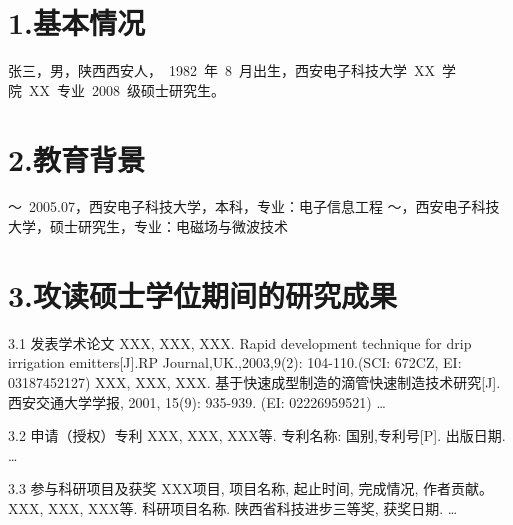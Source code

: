 
\begin{resume}

\section*{1.\hspace{0.75em}基本情况}
张三，男，陕西西安人，~1982~年~8~月出生，西安电子科技大学~XX~学院~XX~专业~2008~级硕士研究生。
\section*{2.\hspace{0.75em}教育背景}
\begin{resumelist*}
～~2005.07，西安电子科技大学，本科，专业：电子信息工程
～\hspace{3.5em}，西安电子科技大学，硕士研究生，专业：电磁场与微波技术
\end{resumelist*}

\section*{3.\hspace{0.75em}攻读硕士学位期间的研究成果}
\begin{resumelist}{\hspace{-0.25em}3.1\hspace{0.5em} 发表学术论文}
\resumelistitem XXX, XXX, XXX. Rapid development technique for drip irrigation emitters[J].RP Journal,UK.,2003,9(2): 104-110.(SCI: 672CZ, EI: 03187452127)
\resumelistitem XXX, XXX, XXX. 基于快速成型制造的滴管快速制造技术研究[J]. 西安交通大学学报, 2001, 15(9): 935-939. (EI: 02226959521)
\resumelistitem \ldots
\end{resumelist}

\begin{resumelist}{\hspace{-0.25em}3.2\hspace{0.5em} 申请（授权）专利}
\resumelistitem XXX, XXX, XXX等. 专利名称: 国别,专利号[P]. 出版日期.
\resumelistitem \ldots
\end{resumelist}

\begin{resumelist}{\hspace{-0.25em}3.3\hspace{0.5em} 参与科研项目及获奖}
\resumelistitem XXX项目, 项目名称, 起止时间, 完成情况, 作者贡献。
\resumelistitem XXX, XXX, XXX等. 科研项目名称. 陕西省科技进步三等奖, 获奖日期.
\resumelistitem \ldots
\end{resumelist}
\end{resume}
